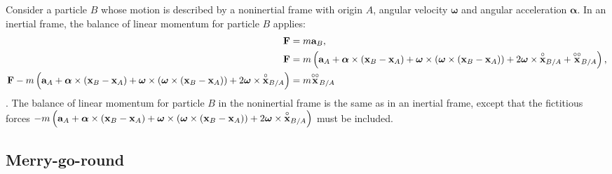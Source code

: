 \documentclass[
  letterpaper,
  DIV=11,
  numbers=noendperiod]{scrreprt}
\newcommand{\lp}{\left(}
\newcommand{\rp}{\right)}
\newcommand{\bomega}{\boldsymbol{\omega}}
\newcommand{\balpha}{\boldsymbol{\alpha}}
\begin{document}
\begin{tcolorbox}[enhanced jigsaw, arc=.35mm, bottomrule=.15mm, bottomtitle=1mm, breakable, colback=white, colbacktitle=quarto-callout-important-color!10!white, colframe=quarto-callout-important-color-frame, coltitle=black, left=2mm, leftrule=.75mm, opacityback=0, opacitybacktitle=0.6, rightrule=.15mm, title=\textcolor{quarto-callout-important-color}{\faExclamation}\hspace{0.5em}{Note!}, titlerule=0mm, toprule=.15mm, toptitle=1mm]

Consider a particle \(B\) whose motion is described by a noninertial
frame with origin \(A\), angular velocity \(\bomega\) and angular
acceleration \(\balpha\). In an inertial frame, the balance of linear
momentum for particle \(B\) applies: \begin{align}
    {\bf F} &= m{\bf a}_B,\\
    {\bf F} &= m\left({\bf a}_A+\balpha\times({\bf x}_B-{\bf x}_A)+\bomega\times\lp\bomega\times\lp{\bf x}_B-{\bf x}_A\rp\rp+2\bomega\times\overset{\circ}{\bf x}_{B/A}+\overset{\circ\circ}{\bf x}_{B/A}\right),\\
    {\bf F}-m\left({\bf a}_A+\balpha\times({\bf x}_B-{\bf x}_A)+\bomega\times\lp\bomega\times\lp{\bf x}_B-{\bf x}_A\rp\rp+2\bomega\times\overset{\circ}{\bf x}_{B/A}\right) &= m\overset{\circ\circ}{\bf x}_{B/A}
\end{align}. The balance of linear momentum for particle \(B\) in the
noninertial frame is the same as in an inertial frame, except that the
fictitious forces
\(-m\left({\bf a}_A+\balpha\times({\bf x}_B-{\bf x}_A)+\bomega\times\lp\bomega\times\lp{\bf x}_B-{\bf x}_A\rp\rp+2\bomega\times\overset{\circ}{\bf x}_{B/A}\right)\)
must be included.

\end{tcolorbox}

\subsection{Merry-go-round}\label{merry-go-round}
\end{document}
